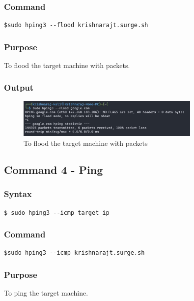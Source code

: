 \documentclass[11pt]{article}
\begin{document}
\subsubsection*{Command}
\begin{verbatim}
$sudo hping3 --flood krishnarajt.surge.sh
\end{verbatim}

\subsubsection*{Purpose}
To flood the target machine with packets.

\subsubsection*{Output}
\begin{figure}[H]
    \centering
    \includegraphics[width=0.8\textwidth]{hping flood.jpg}
    \caption{To flood the target machine with packets}
    \label{fig:3}
\end{figure}

\subsection{Command 4 - Ping}

\subsubsection*{Syntax}
\begin{verbatim}
$ sudo hping3 --icmp target_ip
\end{verbatim}

\subsubsection*{Command}
\begin{verbatim}
$sudo hping3 --icmp krishnarajt.surge.sh
\end{verbatim}

\subsubsection*{Purpose}
To ping the target machine.
\end{document}
